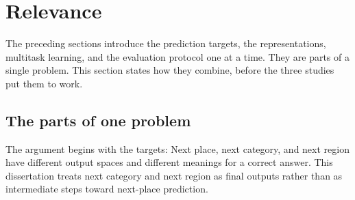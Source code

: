 \section{Relevance}
\label{sec:fund:relevance}

The preceding sections introduce the prediction targets, the representations, multitask
learning, and the evaluation protocol one at a time. They are parts of a
single problem. This section states how they combine, before the three studies put
them to work.

\subsection{The parts of one problem}
The argument begins with the targets: Next place, next category, and next region have
different output spaces and different meanings for a correct answer. This dissertation
treats next category and next region as final outputs rather than as intermediate
steps toward next-place prediction.

